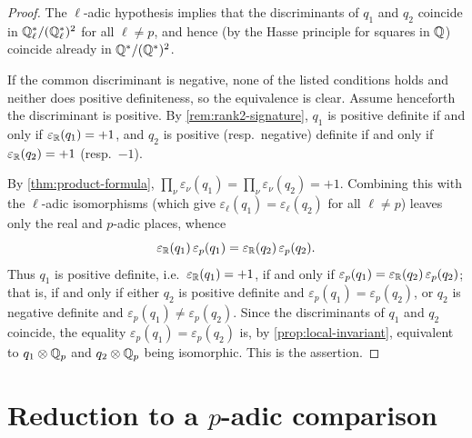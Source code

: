 \begin{proof}
  The \(\ell\)-adic hypothesis implies that the discriminants of \(q_1\) and
  \(q_2\) coincide in \(\mathbb{Q}_\ell^*/(\mathbb{Q}_\ell^*)^2\) for all \(\ell \neq p\), and
  hence (by the Hasse principle for squares in \(\mathbb{Q}\)) coincide already in
  \(\mathbb{Q}^*/(\mathbb{Q}^*)^2\).

  If the common discriminant is negative, none of the listed conditions holds
  and neither does positive definiteness, so the equivalence is clear. Assume
  henceforth the discriminant is positive. By \cref{rem:rank2-signature},
  \(q_1\) is positive definite if and only if \(\varepsilon_{\mathbb{R}}(q_1) = +1\), and
  \(q_2\) is positive (resp.\ negative) definite if and only if
  \(\varepsilon_{\mathbb{R}}(q_2) = +1\) (resp.\ \(-1\)).

  By \cref{thm:product-formula},
  \(\prod_\nu \varepsilon_\nu(q_1) = \prod_\nu \varepsilon_\nu(q_2) = +1\).
  Combining this with the \(\ell\)-adic isomorphisms (which give
  \(\varepsilon_\ell(q_1) = \varepsilon_\ell(q_2)\) for all \(\ell \neq p\))
  leaves only the real and \(p\)-adic places, whence
  \[\varepsilon_{\mathbb{R}}(q_1)\,\varepsilon_p(q_1)
    = \varepsilon_{\mathbb{R}}(q_2)\,\varepsilon_p(q_2).\]
  Thus \(q_1\) is positive definite, i.e.\ \(\varepsilon_{\mathbb{R}}(q_1) = +1\), if and
  only if \(\varepsilon_p(q_1) = \varepsilon_{\mathbb{R}}(q_2)\,\varepsilon_p(q_2)\); that
  is, if and only if either \(q_2\) is positive definite and
  \(\varepsilon_p(q_1) = \varepsilon_p(q_2)\), or \(q_2\) is negative definite
  and \(\varepsilon_p(q_1) \neq \varepsilon_p(q_2)\). Since the discriminants of
  \(q_1\) and \(q_2\) coincide, the equality
  \(\varepsilon_p(q_1) = \varepsilon_p(q_2)\) is, by
  \cref{prop:local-invariant}, equivalent to \(q_1 \otimes \mathbb{Q}_p\) and
  \(q_2 \otimes \mathbb{Q}_p\) being isomorphic. This is the assertion.
\end{proof}

\section*{Reduction to a $p$-adic comparison}

